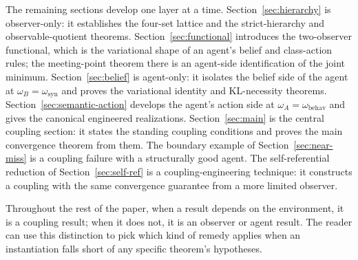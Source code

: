 The remaining sections develop one layer at a time. Section~\ref{sec:hierarchy} is observer-only: it establishes the four-set lattice and the strict-hierarchy and observable-quotient theorems. Section~\ref{sec:functional} introduces the two-observer functional, which is the variational shape of an agent's belief and class-action rules; the meeting-point theorem there is an agent-side identification of the joint minimum. Section~\ref{sec:belief} is agent-only: it isolates the belief side of the agent at $\omega_B=\omega_{\mathrm{syn}}$ and proves the variational identity and KL-necessity theorems. Section~\ref{sec:semantic-action} develops the agent's action side at $\omega_A=\omega_{\mathrm{behav}}$ and gives the canonical engineered realizations. Section~\ref{sec:main} is the central coupling section: it states the standing coupling conditions and proves the main convergence theorem from them. The boundary example of Section~\ref{sec:near-miss} is a coupling failure with a structurally good agent. The self-referential reduction of Section~\ref{sec:self-ref} is a coupling-engineering technique: it constructs a coupling with the same convergence guarantee from a more limited observer.

Throughout the rest of the paper, when a result depends on the environment, it is a coupling result; when it does not, it is an observer or agent result. The reader can use this distinction to pick which kind of remedy applies when an instantiation falls short of any specific theorem's hypotheses.
